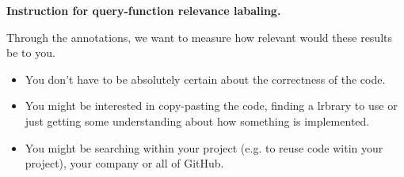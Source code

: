 \documentclass[12 pt]{article}
\begin{document}
\begin{center} 
{\bf \Large Instruction for query-function relevance labaling. } 
\end{center}

Through the annotations, we want to measure how relevant would these results be to you. 
\begin{itemize}
	\item You don't have to be absolutely certain about the correctness of the code.
	\item You might be interested in copy-pasting the code, finding a lrbrary to use or just getting some understanding about how something is implemented.
	\item You might be searching within your project (e.g. to reuse code witin your project), your company or all of GitHub.
\end{itemize}
\end{document}
